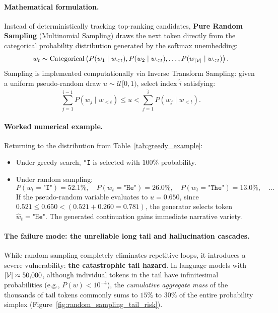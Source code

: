 \documentclass[../../main.tex]{subfiles}
\begin{document}
\paragraph{Mathematical formulation.}
Instead of deterministically tracking top-ranking candidates, \textbf{Pure Random Sampling} (Multinomial Sampling) draws the next token directly from the categorical probability distribution generated by the softmax unembedding:
\begin{equation}
\label{eq:random_multinomial_sampling}
w_t \sim \operatorname{Categorical}\left(P(w_1 \mid w_{<t}), P(w_2 \mid w_{<t}), \dots, P(w_{|\mathcal{V}|} \mid w_{<t})\right).
\end{equation}
Sampling is implemented computationally via Inverse Transform Sampling: given a uniform pseudo-random draw $u \sim \mathcal{U}[0, 1)$, select index $\hat{i}$ satisfying:
\begin{equation}
\label{eq:inverse_transform_sampling}
\sum_{j=1}^{\hat{i}-1} P(w_j \mid w_{<t}) \le u < \sum_{j=1}^{\hat{i}} P(w_j \mid w_{<t}).
\end{equation}

\paragraph{Worked numerical example.}
Returning to the distribution from Table~\ref{tab:greedy_example}:
\begin{itemize}
    \item Under greedy search, \texttt{"I} is selected with $100\%$ probability.
    \item Under random sampling:
    \begin{equation}
    P(w_t = \texttt{"I"}) = 52.1\%, \quad P(w_t = \texttt{"He"}) = 26.0\%, \quad P(w_t = \texttt{"The"}) = 13.0\%, \quad \dots
    \end{equation}
    If the pseudo-random variable evaluates to $u = 0.650$, since $0.521 \le 0.650 < (0.521 + 0.260 = 0.781)$, the generator selects token $\hat{w}_t = \texttt{"He"}$. The generated continuation gains immediate narrative variety.
\end{itemize}

\paragraph{The failure mode: the unreliable long tail and hallucination cascades.}
While random sampling completely eliminates repetitive loops, it introduces a severe vulnerability: \textbf{the catastrophic tail hazard}.
In language models with $|\mathcal{V}| \approx 50{,}000$, although individual tokens in the tail have infinitesimal probabilities (e.g., $P(w) < 10^{-4}$), the \emph{cumulative aggregate mass} of the thousands of tail tokens commonly sums to $15\%$ to $30\%$ of the entire probability simplex (Figure~\ref{fig:random_sampling_tail_risk}).
\end{document}
